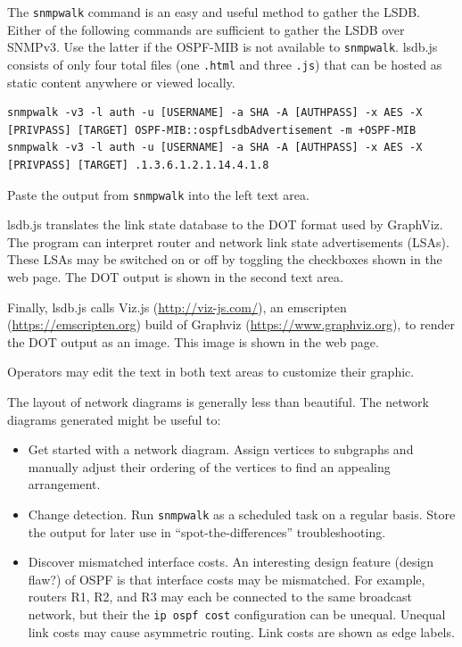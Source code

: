\documentclass[12pt]{article}
\begin{document}
The \texttt{snmpwalk} command is an easy and useful method to gather the LSDB. Either of the following commands are sufficient to gather the LSDB over SNMPv3. Use the latter if the OSPF-MIB is not available to \texttt{snmpwalk}. lsdb.js consists of only four total files (one \texttt{.html} and three \texttt{.js}) that can be hosted as static content anywhere or viewed locally.

\begin{lstlisting}
snmpwalk -v3 -l auth -u [USERNAME] -a SHA -A [AUTHPASS] -x AES -X [PRIVPASS] [TARGET] OSPF-MIB::ospfLsdbAdvertisement -m +OSPF-MIB
snmpwalk -v3 -l auth -u [USERNAME] -a SHA -A [AUTHPASS] -x AES -X [PRIVPASS] [TARGET] .1.3.6.1.2.1.14.4.1.8
\end{lstlisting}

Paste the output from \texttt{snmpwalk} into the left text area.

lsdb.js translates the link state database to the DOT format used by GraphViz. The program can interpret router and network link state advertisements (LSAs). These LSAs may be switched on or off by toggling the checkboxes shown in the web page. The DOT output is shown in the second text area.

Finally, lsdb.js calls Viz.js (\url{http://viz-js.com/}), an emscripten (\url{https://emscripten.org}) build of Graphviz (\url{https://www.graphviz.org}), to render the DOT output as an image. This image is shown in the web page.

Operators may edit the text in both text areas to customize their graphic.

The layout of network diagrams is generally less than beautiful. The network diagrams generated might be useful to:

\begin{itemize}
	\item Get started with a network diagram. Assign vertices to subgraphs and manually adjust their ordering of the vertices to find an appealing arrangement.
	\item Change detection. Run \texttt{snmpwalk} as a scheduled task on a regular basis. Store the output for later use in ``spot-the-differences'' troubleshooting.
	\item Discover mismatched interface costs. An interesting design feature (design flaw?) of OSPF is that interface costs may be mismatched. For example, routers R1, R2, and R3 may each be connected to the same broadcast network, but their the \texttt{ip ospf cost} configuration can be unequal. Unequal link costs may cause asymmetric routing. Link costs are shown as edge labels.	
\end{itemize}
\end{document}
